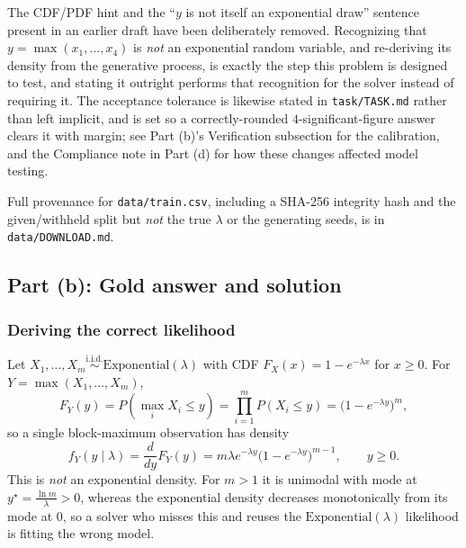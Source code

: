 \documentclass[11pt]{article}
\begin{document}
The CDF/PDF hint and the ``$y$ is not itself an exponential draw'' sentence
present in an earlier draft have been deliberately removed. Recognizing that
$y = \max(x_1,\dots,x_4)$ is \emph{not} an exponential random variable, and
re-deriving its density from the generative process, is exactly the step this
problem is designed to test, and stating it outright performs that recognition
for the solver instead of requiring it. The acceptance tolerance is likewise
stated in \texttt{task/TASK.md} rather than left implicit, and is set so a
correctly-rounded $4$-significant-figure answer clears it with margin; see
Part (b)'s Verification subsection for the calibration, and the Compliance note
in Part (d) for how these changes affected model testing.

Full provenance for \texttt{data/train.csv}, including a SHA-256 integrity hash
and the given/withheld split but \emph{not} the true $\lambda$ or the generating
seeds, is in \texttt{data/DOWNLOAD.md}.

\subsection*{Part (b): Gold answer and solution}

\subsubsection*{Deriving the correct likelihood}

Let $X_1,\dots,X_m \overset{\text{i.i.d.}}{\sim} \mathrm{Exponential}(\lambda)$
with CDF $F_X(x) = 1-e^{-\lambda x}$ for $x\ge0$. For
$Y=\max(X_1,\dots,X_m)$,
\[
  F_Y(y) = P(\max_i X_i \le y) = \prod_{i=1}^m P(X_i \le y) = \big(1-e^{-\lambda y}\big)^m,
\]
so a single block-maximum observation has density
\[
  f_Y(y \mid \lambda) = \frac{d}{dy}F_Y(y) = m\lambda e^{-\lambda y}\big(1-e^{-\lambda y}\big)^{m-1}, \qquad y \ge 0.
\]
This is \emph{not} an exponential density. For $m>1$ it is unimodal with mode at
$y^\star = \frac{\ln m}{\lambda} > 0$, whereas the exponential density decreases
monotonically from its mode at $0$, so a solver who misses this and reuses the
$\mathrm{Exponential}(\lambda)$ likelihood is fitting the wrong model.
\end{document}
